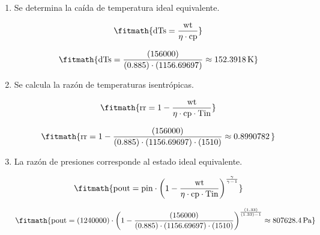 \begin{enumerate}

\item Se determina la caída de temperatura ideal equivalente.

\[\fitmath{\mathrm{dTs}=\frac{\mathrm{wt}}{\eta\cdot \mathrm{cp}}}\]

\[\fitmath{\mathrm{dTs}=\frac{(156000)}{(0.885)\cdot (1156.69697)}\approx 152.3918\,\mathrm{K}}\]

\item Se calcula la razón de temperaturas isentrópicas.

\[\fitmath{\mathrm{rr}=1-\frac{\mathrm{wt}}{\eta\cdot \mathrm{cp}\cdot \mathrm{Tin}}}\]

\[\fitmath{\mathrm{rr}=1-\frac{(156000)}{(0.885)\cdot (1156.69697)\cdot (1510)}\approx 0.8990782\,}\]

\item La razón de presiones corresponde al estado ideal equivalente.

\[\fitmath{\mathrm{pout}=\mathrm{pin}\cdot {\left(1-\frac{\mathrm{wt}}{\eta\cdot \mathrm{cp}\cdot \mathrm{Tin}}\right)}^{\frac{\gamma}{\gamma-1}}}\]

\[\fitmath{\mathrm{pout}=(1240000)\cdot {\left(1-\frac{(156000)}{(0.885)\cdot (1156.69697)\cdot (1510)}\right)}^{\frac{(1.33)}{(1.33)-1}}\approx 807628.4\,\mathrm{Pa}}\]

\end{enumerate}
